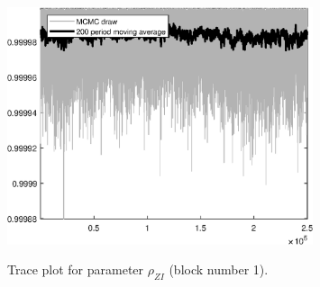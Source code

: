 \begin{figure}[H]
\centering
  \includegraphics[width=0.8\textwidth]{BRS_imp_mobility/graphs/TracePlot_rho_ZI_blck_1}\\
    \caption{Trace plot for parameter ${\rho_{ZI}}$ (block number 1).}
\end{figure}
